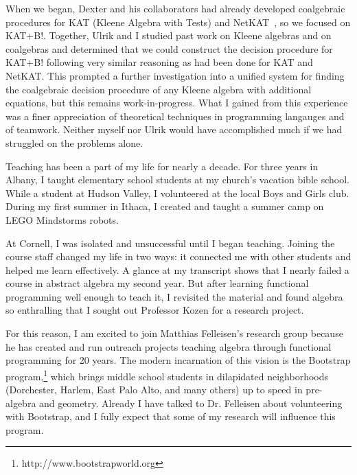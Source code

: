 \documentclass[12pt]{article}
\newcommand{\hdr}[2]{\vspace{-0.4cm}{\flushleft{\hrulefill\\\textbf{#1}\hfill{#2}\\\vspace{-0.2cm}\hrulefill}}\vspace{0.1cm}}
\begin{document}
When we began, Dexter and his collaborators had already developed coalgebraic procedures for KAT (Kleene Algebra with Tests) and NetKAT~\cite{foster2014coalgebraic}, so we focused on KAT+B!.
Together, Ulrik and I studied past work on Kleene algebras and on coalgebras and determined that we could construct the decision procedure for KAT+B! following very similar reasoning as had been done for KAT and NetKAT.
This prompted a further investigation into a unified system for finding the coalgebraic decision procedure of any Kleene algebra with additional equations, but this remains work-in-progress.
What I gained from this experience was a finer appreciation of theoretical techniques in programming langauges and of teamwork.
Neither myself nor Ulrik would have accomplished much if we had struggled on the problems alone.

\hdr{Broader Impacts}{}

Teaching has been a part of my life for nearly a decade.
For three years in Albany, I taught elementary school students at my church's vacation bible school.
While a student at Hudson Valley, I volunteered at the local Boys and Girls club.
During my first summer in Ithaca, I created and taught a summer camp on LEGO Mindstorms robots.

At Cornell, I was isolated and unsuccessful until I began teaching.
Joining the course staff changed my life in two ways: it connected me with other students and helped me learn effectively.
A glance at my transcript shows that I nearly failed a course in abstract algebra my second year.
But after learning functional programming well enough to teach it, I revisited the material and found algebra so enthralling that I sought out Professor Kozen for a research project.

For this reason, I am excited to join Matthias Felleisen's research group because he has created and run outreach projects teaching algebra through functional programming for 20 years.
The modern incarnation of this vision is the Bootstrap program,\footnote{http://www.bootstrapworld.org} which brings middle school students in dilapidated neighborhoods (Dorchester, Harlem, East Palo Alto, and many others) up to speed in pre-algebra and geometry.
Already I have talked to Dr. Felleisen about volunteering with Bootstrap, and I fully expect that some of my research will influence this program.

\vfill
\renewcommand{\section}[2]{}
\begin{multicols}{2}
\footnotesize


\end{multicols}
\end{document}

